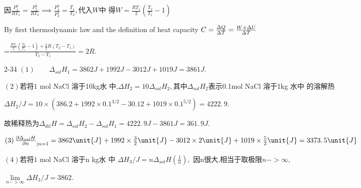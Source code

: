 \documentclass{article}
\begin{document}
因\qquad $\frac{P_{1}^{2}}{RT_{1}}=\frac{P_{2}^{2}}{RT_{2}}\implies 
\frac{P_{1}^{2}}{P_{2}^{2}}=\frac{T_{1}}{T_{2}},$代入$W$中%
得\qquad $W=\frac{RT_{1}}{2}\left( \frac{T_{2}}{T_{1}}-1\right) $

By first thermodynamic law and the definition of heat capacity $C=\frac{%
\Delta Q}{\Delta T}=\frac{W+\Delta U}{\Delta T}$

=$\frac{\frac{RT_{1}}{2}\left( \frac{T_{2}}{T_{1}}-1\right) +\frac{3}{2}%
R\left( T_{2}-T_{1}\right) }{T_{2}-T_{1}}=\allowbreak 2R.$

2-34 $\left( 1\right) \qquad \Delta _{sol}H_{1}=3862\unit{J}+1992\unit{J}%
-3012\unit{J}+1019\unit{J}=\allowbreak 3861\unit{J}.$

$\left( 2\right) $若将$1$ mol NaCl 溶于10kg水%
中,$\Delta H_{2}=10\Delta _{sol}H_{2},$其中$\Delta
_{sol}H_{2}$表示0.1mol NaCl 溶于1kg 水中%
的溶解热

$\Delta H_{2}/\unit{J}=10\times \left( 386.2+1992\times
0.1^{3/2}-30.12+1019\times 0.1^{5/2}\right) =\allowbreak 4222.\,\allowbreak
9.$

故稀释热为\qquad $\Delta _{dil}H=\Delta
_{sol}H_{2}-\Delta _{sol}H_{1}=\allowbreak \allowbreak 4222.\,\allowbreak 9%
\unit{J}-\allowbreak 3861\unit{J}=\allowbreak 361.\,\allowbreak 9\unit{J}.$

$\left( 3\right) \frac{\partial \Delta _{sol}H}{\partial n}_{|n=1}=3862\unit{%
J}+1992\times \frac{3}{2}\unit{J}-3012\times 2\unit{J}+1019\times \frac{5}{2}%
\unit{J}=\allowbreak 3373.\,\allowbreak 5\unit{J}$

$\left( 4\right) $若将$1$ mol NaCl 溶于n kg水%
中 $\Delta H_{3}/\unit{J}=n\Delta _{sol}H\left( \frac{1}{n}\right) ,$%
因n很大,相当于取极限$%
n->\infty ,$

$\underset{n->\infty }{\lim }\Delta H_{3}/\unit{J}=3862.$
\end{document}
